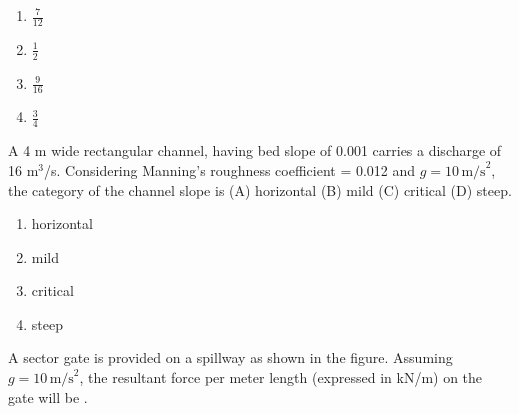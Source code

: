 \begin{multicols}{4}
\begin{enumerate}
\item $\frac{7}{12}$
\item $\frac{1}{2}$
\item $\frac{9}{16}$
\item $\frac{3}{4}$
\end{enumerate} 
\end{multicols}

\item A 4 m wide rectangular channel, having bed slope of 0.001 carries a discharge of 16 m$^3$/s. Considering Manning's roughness coefficient = 0.012 and $g = 10 \, \text{m/s}^2$, the category of the channel slope is  (A) horizontal   (B) mild   (C) critical   (D) steep.
\begin{multicols}{4}
\begin{enumerate}
\item horizontal
\item mild
\item critical
\item steep
\end{enumerate} 
\end{multicols}
\item A sector gate is provided on a spillway as shown in the figure. Assuming $g = 10 \, \text{m/s}^2$, the resultant force per meter length (expressed in kN/m) on the gate will be \underline{\hspace{2cm}}.\\

